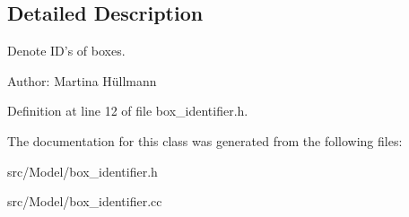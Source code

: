 \subsection{Detailed Description}
Denote ID's of boxes. 

\begin{Desc}
\item[Author:]Martina Hüllmann \end{Desc}


Definition at line 12 of file box\_\-identifier.h.

The documentation for this class was generated from the following files:\begin{CompactItemize}
\item 
src/Model/box\_\-identifier.h\item 
src/Model/box\_\-identifier.cc\end{CompactItemize}
